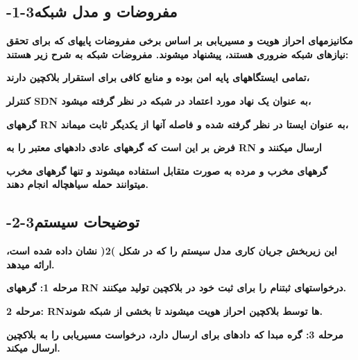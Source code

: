 \documentclass{article} %
\begin{document}
\noindent 
\subsection{ -1-3مفروضات و مدل شبکه}

\noindent 
{\bf مکانیزمهای احراز هویت و مسیریابی بر اساس برخی مفروضات پایهای که برای تحقق نیازهای شبکه ضروری هستند، پیشنهاد میشوند. مفروضات شبکه به شرح زیر هستند:}


{\bf  تمامی ایستگاههای پایه امن بوده و منابع کافی برای استقرار بلاکچین دارند،}


{\bf  کنترلر SDN به عنوان یک نهاد مورد اعتماد در شبکه در نظر گرفته میشود،}


{\bf  گرههای RN به عنوان ایستا در نظر گرفته شده و فاصله آنها از یکدیگر ثابت میماند،}


{\bf  فرض بر این است که گرههای عادی دادههای معتبر را به RN ارسال میکنند و}


{\bf  گرههای مخرب و مرده به صورت متقابل استفاده میشوند و تنها گرههای مخرب میتوانند حمله سیاهچاله انجام دهند.}

\noindent 
\subsection{ -2-3توضیحات سیستم}

\noindent 
{\bf این زیربخش جریان کاری مدل سیستم را که در شکل )2( نشان داده شده است، ارائه میدهد.}


{\bf  مرحله 1: گرههای RN درخواستهای ثبتنام را برای ثبت خود در بلاکچین تولید میکنند.}


{\bf  مرحله 2: RNها توسط بلاکچین احراز هویت میشوند تا بخشی از شبکه شوند.}

\noindent 
{\bf }


{\bf  مرحله 3: گره مبدا که دادهای برای ارسال دارد، درخواست مسیریابی را به بلاکچین ارسال میکند.}
\end{document}
